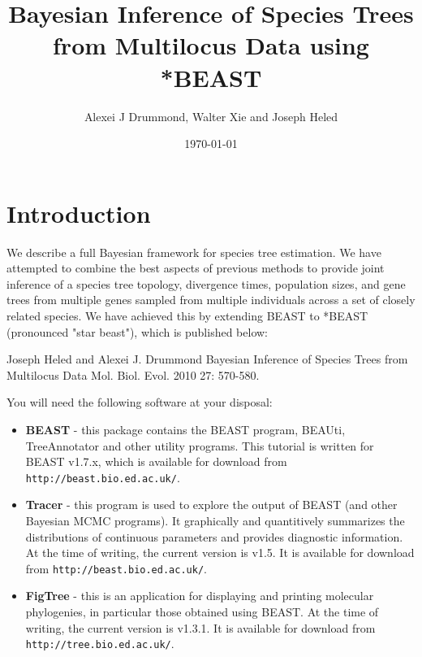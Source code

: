 \documentclass[12pt]{article}
\begin{document}
\title{Bayesian Inference of Species Trees from Multilocus Data using *BEAST }

\author{Alexei J Drummond, Walter Xie and Joseph Heled}

\date{\today{}}

\maketitle

\section*{Introduction}

We describe a full Bayesian framework for species tree estimation. We have attempted to combine the best aspects of previous methods to provide joint inference of a species tree topology, divergence times, population sizes, and gene trees from multiple genes sampled from multiple individuals across a set of closely related species. We have achieved this by extending BEAST to *BEAST (pronounced "star beast"), which is published below:

Joseph Heled and Alexei J. Drummond
Bayesian Inference of Species Trees from Multilocus Data
Mol. Biol. Evol. 2010 27: 570-580. 

You will need the following software at your disposal:

\begin{itemize}

\item {\bf BEAST} - this package contains the BEAST program, BEAUti, TreeAnnotator and other utility programs. This tutorial is written for BEAST v1.7.x, which is available for download from  \texttt{http://beast.bio.ed.ac.uk/}.
\item {\bf Tracer} - this program is used to explore the output of BEAST (and other Bayesian MCMC programs). It graphically and
quantitively summarizes the distributions of continuous parameters and provides diagnostic information. At the time of
writing, the current version is v1.5. It is available for download from \texttt{http://beast.bio.ed.ac.uk/}.
\item {\bf FigTree} - this is an application for displaying and printing molecular phylogenies, in particular those obtained using
BEAST. At the time of writing, the current version is v1.3.1. It is available for download from \texttt{http://tree.bio.ed.ac.uk/}.
\end{itemize}
\end{document}
